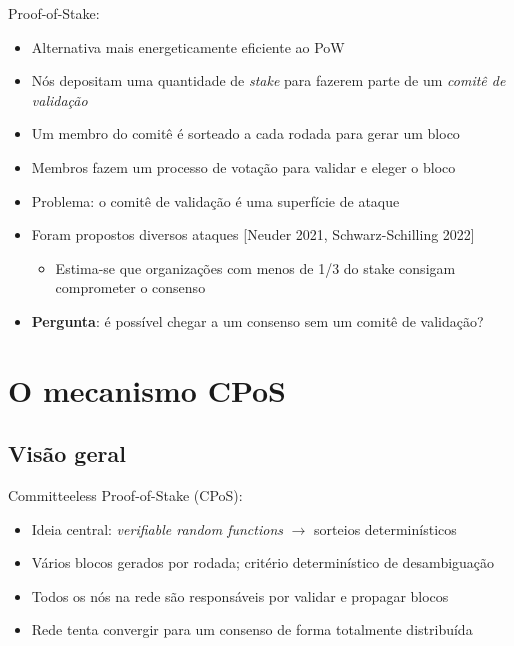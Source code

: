 \documentclass{beamer}
\begin{document}
\begin{frame}
Proof-of-Stake:
\begin{itemize}
    \item Alternativa mais energeticamente eficiente ao PoW
    \item Nós depositam uma quantidade de \textit{stake} para fazerem parte de um \textit{comitê de validação}
    \item Um membro do comitê é sorteado a cada rodada para gerar um bloco
    \item Membros fazem um processo de votação para validar e eleger o bloco
\end{itemize}
\end{frame}

\begin{frame}
\begin{itemize}
    \item Problema: o comitê de validação é uma superfície de ataque
    \item Foram propostos diversos ataques [Neuder 2021, Schwarz-Schilling 2022]
    \begin{itemize}
        \item Estima-se que organizações com menos de 1/3 do stake consigam comprometer o consenso
    \end{itemize}
    \item \textbf{Pergunta}: é possível chegar a um consenso sem um comitê de validação?
\end{itemize}
\end{frame}

\section{O mecanismo CPoS}
\subsection{Visão geral}
\begin{frame}
Committeeless Proof-of-Stake (CPoS): 
\begin{itemize}
    \item Ideia central: \textit{verifiable random functions} $\rightarrow$ sorteios determinísticos
    \item Vários blocos gerados por rodada; critério determinístico de desambiguação
    \item Todos os nós na rede são responsáveis por validar e propagar blocos
    \item Rede tenta convergir para um consenso de forma totalmente distribuída
\end{itemize}
\end{frame}
\end{document}
